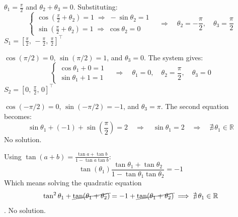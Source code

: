 \newpage
\begin{tcolorbox}[title={Case 1: $\cos(\theta_1)=0$}, colback=blue!5, colframe=blue!40!black, breakable]
$\theta_1 = \tfrac{\pi}{2}$ and $\theta_2+\theta_3=0$. Substituting:
\[
\begin{cases}
    \cos\!\left(\tfrac{\pi}{2}+\theta_2\right) = 1 \;\Longrightarrow\; -\sin\theta_2=1\\[4pt]
    \sin\!\left(\tfrac{\pi}{2}+\theta_2\right) = 1 \;\Longrightarrow\; \cos\theta_2=0
\end{cases}
\quad\Longrightarrow\quad \theta_2 = -\frac{\pi}{2},\quad \theta_3=\frac{\pi}{2}
\]
\tcblower
\centering $\displaystyle S_1 = \left[\frac{\pi}{2},\,-\frac{\pi}{2},\,\frac{\pi}{2}\right]^\top$
\end{tcolorbox}
 
\medskip
 
\begin{tcolorbox}[title={Case 2: $\cos(\theta_1+\theta_2)=0$ with $\theta_1+\theta_2=+\pi/2$}, colback=green!5, colframe=green!40!black, breakable]
$\cos(\pi/2)=0$, $\sin(\pi/2)=1$, and $\theta_3=0$. The system gives:
\[
\begin{cases}
    \cos\theta_1 + 0 = 1\\[4pt]
    \sin\theta_1 + 1 = 1
\end{cases}
\quad\Longrightarrow\quad \theta_1=0,\quad \theta_2=\frac{\pi}{2},\quad \theta_3=0
\]
\tcblower
\centering $\displaystyle S_2 = \left[0,\,\frac{\pi}{2},\,0\right]^\top$
\end{tcolorbox}
\begin{tcolorbox}[title={Case 3: $\cos(\theta_1+\theta_2)=0$ with $\theta_1+\theta_2=-\pi/2$}, colback=red!5, colframe=red!40!black, breakable]
$\cos(-\pi/2)=0$, $\sin(-\pi/2)=-1$, and $\theta_3=\pi$. The second equation becomes:
\[
\sin\theta_1 + (-1) + \sin\!\left(\frac{\pi}{2}\right) = 2 \quad\Longrightarrow\quad \sin\theta_1 = 2 \quad\Longrightarrow\quad \nexists\,\theta_1\in\mathbb{R}
\]
\tcblower
\centering No solution.
\end{tcolorbox}

\begin{tcolorbox}[title={Case 4: everything goes well} , colback=orange!5, colframe=orange!70!black, breakable]
Using $\tan(a+b) = \frac{\tan a + \tan b}{1 - \tan a \tan b}$: 
$$\tan(\theta_1)\frac{\tan \theta_1 + \tan \theta_2}{1 - \tan \theta_1 \tan \theta_2} = -1$$
Which means solving the quadratic equation $$\tan^2\theta_1 + \cancel{\tan(\theta_1+\theta_2)}=-1 +\cancel{\tan(\theta_1+\theta_2)} \implies \nexists \, \theta_1\in\mathbb{R}$$. 
\tcblower
\centering No solution.
\end{tcolorbox}

